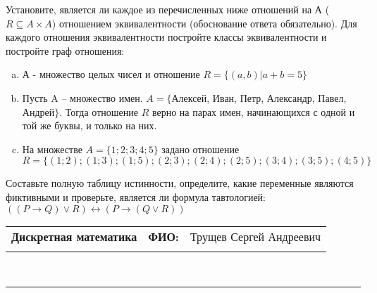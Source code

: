 \documentclass[10pt]{exam}
\newcommand{\class}{Дискретная математика}
\newcommand{\examdate}{}
\begin{document}
\begin{questions}
\question
Установите, является ли каждое из перечисленных ниже отношений на А ($R \subseteq A \times A$) отношением эквивалентности (обоснование ответа обязательно). Для каждого отношения эквивалентности постройте классы 
эквивалентности и постройте граф отношения:
\begin{enumerate} [a)]\setcounter{enumi}{0}
\item А - множество целых чисел и отношение $R = \{(a,b)|a + b = 5\}$
\item Пусть A – множество имен. $A = \{ $Алексей, Иван, Петр, Александр, Павел, Андрей$ \}$. Тогда отношение $R $ верно на парах имен, начинающихся с одной и той же буквы, и только на них.
\item На множестве $A = \{1; 2; 3; 4; 5\}$ задано отношение $R = \{(1; 2); (1; 3); (1; 5); (2; 3); (2; 4); (2; 5); (3; 4); (3; 5); (4; 5)\}$
\end{enumerate}\question Составьте полную таблицу истинности, определите, какие переменные являются фиктивными и проверьте, является ли формула тавтологией:
$((P \rightarrow Q) \lor R) \leftrightarrow (P \rightarrow (Q \lor R))$

\end{questions}
\newpage
\begin{flushright}
\begin{tabular}{p{2.8in} r l}
\textbf{\class} & \textbf{ФИО:} &Трущев Сергей Андреевич
\\

\textbf{\examdate} &&\\
\end{tabular}\\
\end{flushright}
\rule[1ex]{\textwidth}{.1pt}
\end{document}
